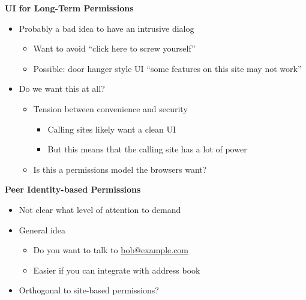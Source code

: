 \documentclass[helvetica]{seminar}
\newcommand{\heading}[1]{%
  \begin{center} 
    \large\bf 
    #1 
  \end{center} 
  \vspace{.4 in}}
\begin{document}
\begin{slide}
\heading{UI for Long-Term Permissions}

\begin{itemize}
\item Probably a bad idea to have an intrusive dialog
\begin{itemize}
\item Want to avoid ``click here to screw yourself''
\item Possible: door hanger style UI ``some features on this site may not work''
\end{itemize}

\item Do we want this at all?
  \begin{itemize}
  \item Tension between convenience and security
    \begin{itemize}
    \item Calling sites likely want a clean UI
    \item But this means that the calling site has a lot of power
    \end{itemize}

  \item Is this a permissions model the browsers want?
  \end{itemize}
\end{itemize}
\end{slide}



\begin{slide}
\heading{Peer Identity-based Permissions}

\begin{itemize}
\item Not clear what level of attention to demand
\item General idea
  \begin{itemize}
  \item Do you want to talk to \url{bob@example.com}
  \item Easier if you can integrate with address book
  \end{itemize}

\item Orthogonal to site-based permissions?
\end{itemize}

\end{slide}
\end{document}
